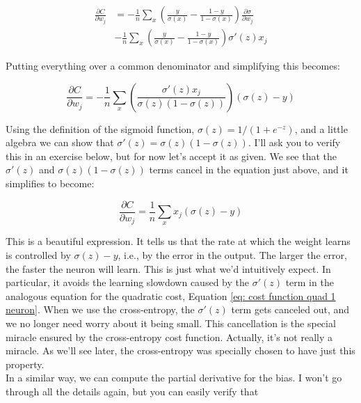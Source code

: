 \documentclass[a4paper,11pt,twoside]{report}
\begin{document}
\begin{equation}
\begin{aligned}
\frac{\partial C}{\partial w_j}&=
-\frac{1}{n}	\sum_x\left(\frac{y}{\sigma(x)}-\frac{1-y}{1-\sigma(x)}\right)\frac{\partial \sigma}{\partial w_j}\\
&
-\frac{1}{n}	\sum_x\left(\frac{y}{\sigma(x)}-\frac{1-y}{1-\sigma(x)}\right)\sigma'(z)x_j
\end{aligned}
\label{eq: derivative w cost cross-entropy calculation1}
\end{equation}

Putting everything over a common denominator and simplifying this becomes:

\begin{equation}
\frac{\partial C}{\partial w_j}=
-\frac{1}{n}	\sum_x\left(\frac{\sigma'(z)x_j}{\sigma(z)(1-\sigma(z))}\right)(\sigma(z)-y)
\label{eq: derivative w cost cross-entropy calculation2}
\end{equation}

Using the definition of the sigmoid function, $\sigma(z)=1/(1+e^{-z})$, and a little algebra we can show that $\sigma'(z)=\sigma(z)(1-\sigma(z))$. I'll ask you to verify this in an exercise below, but for now let's accept it as given. We see that the $\sigma'(z)$ and $\sigma(z)(1-\sigma(z))$ terms cancel in the equation just above, and it simplifies to become:
 
 \begin{equation}
\frac{\partial C}{\partial w_j}=
\frac{1}{n}	\sum_x x_j(\sigma(z)-y)
\label{eq: derivative w cost cross-entropy final}
\end{equation}

This is a beautiful expression. It tells us that the rate at which the weight learns is controlled by $\sigma(z)-y$, i.e., by the error in the output. The larger the error, the faster the neuron will learn. This is just what we'd intuitively expect. In particular, it avoids the learning slowdown caused by the $\sigma'(z)$ term in the analogous equation for the quadratic cost, Equation \ref{eq: cost function quad 1 neuron}. When we use the cross-entropy, the $\sigma'(z)$ term gets canceled out, and we no longer need worry about it being small. This cancellation is the special miracle ensured by the cross-entropy cost function. Actually, it's not really a miracle. As we'll see later, the cross-entropy was specially chosen to have just this property.\\

In a similar way, we can compute the partial derivative for the bias. I won't go through all the details again, but you can easily verify that
\end{document}
